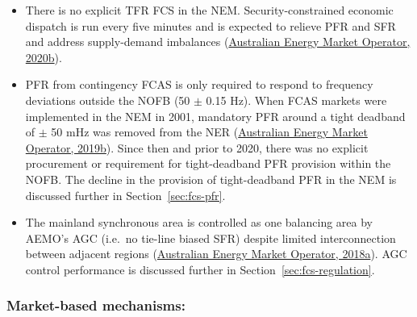 \documentclass[12pt,a4paper,]{report}
\providecommand{\tightlist}{%
  \setlength{\itemsep}{0pt}\setlength{\parskip}{0pt}}
\begin{document}
\begin{itemize}
\tightlist
\item
  There is no explicit TFR FCS in the NEM. Security-constrained economic
  dispatch is run every five minutes and is expected to relieve PFR and
  SFR and address supply-demand imbalances
  (\protect\hyperlink{ref-australianenergymarketoperatorPowerSystemRequirements2020}{Australian
  Energy Market Operator, 2020b}).
\item
  PFR from contingency FCAS is only required to respond to frequency
  deviations outside the NOFB (50 \(\pm\) 0.15 Hz). When FCAS markets
  were implemented in the NEM in 2001, mandatory PFR around a tight
  deadband of \(\pm\) 50 mHz was removed from the NER
  (\protect\hyperlink{ref-australianenergymarketoperatorElectricityRuleChange2019}{Australian
  Energy Market Operator, 2019b}). Since then and prior to 2020, there
  was no explicit procurement or requirement for tight-deadband PFR
  provision within the NOFB. The decline in the provision of
  tight-deadband PFR in the NEM is discussed further in
  Section~\ref{sec:fcs-pfr}.
\item
  The mainland synchronous area is controlled as one balancing area by
  AEMO's AGC (i.e.~no tie-line biased SFR) despite limited
  interconnection between adjacent regions
  (\protect\hyperlink{ref-australianenergymarketoperatorAEMCFrequencyControl2018}{Australian
  Energy Market Operator, 2018a}). AGC control performance is discussed
  further in Section~\ref{sec:fcs-regulation}.
\end{itemize}

\hypertarget{market-based-mechanisms}{%
\subsubsection{Market-based mechanisms:}\label{market-based-mechanisms}}
\end{document}
